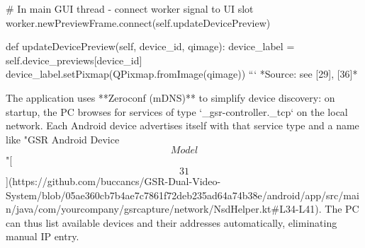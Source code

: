 \documentclass[12pt,a4paper]{article}
\begin{document}
{# In main GUI thread - connect worker signal to UI slot
worker.newPreviewFrame.connect(self.updateDevicePreview)

def updateDevicePreview(self, device_id, qimage):
    device_label = self.device_previews[device_id]
    device_label.setPixmap(QPixmap.fromImage(qimage))
```
*Source: see [29], [36]*

The application uses
**Zeroconf (mDNS)** to simplify device discovery: on startup, the PC
browses for services of type `_gsr-controller._tcp` on the local
network. Each Android device advertises itself with that service type
and a name like "GSR Android Device
\[Model\]"[\[31\]](https://github.com/buccancs/GSR-Dual-Video-System/blob/05ae360cb7b4ae7c7861f72deb235ad64a74b38e/android/app/src/main/java/com/yourcompany/gsrcapture/network/NsdHelper.kt#L34-L41).
The PC can thus list available devices and their addresses
automatically, eliminating manual IP entry.

}
\end{document}
